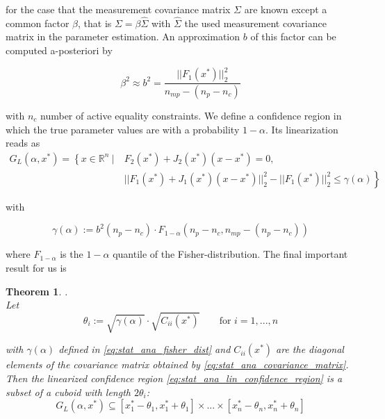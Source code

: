\documentclass{scrartcl}[12pt, halfparskip]
\numberwithin{equation}{section}
\numberwithin{figure}{section}
\numberwithin{table}{section}
\newtheorem{Theorem}{Theorem}
\begin{document}
for the case that the measurement covariance matrix $\Sigma$ are known except a common factor $\beta$, that is $\Sigma = \beta \hat{\Sigma}$ with $\hat{\Sigma}$ the used measurement covariance matrix in the parameter estimation. An approximation $b$ of this factor can be computed a-posteriori by

\begin{equation}
	\beta^2 \approx b^2 = \frac{|| F_1(x^*) ||_2^2}{n_{mp} - (n_p - n_c)}
\end{equation}

with $n_c$ number of active equality constraints. We define a confidence region in which the true parameter values are with a probability $1-\alpha$. Its linearization reads as
\begin{align}
	G_L(\alpha, x^*) = \left\{ x \in \mathbb{R}^n \ | \ \right. & F_2(x^*) + J_2(x^*)(x - x^*) = 0, \label{eq:stat_ana_lin_confidence_region} \\ 
	& \left. || F_1(x^*) + J_1(x^*)(x - x^*) ||_2^2 - || F_1(x^*)||_2^2 \le \gamma(\alpha) \right\} \nonumber	
\end{align}

with 

\begin{equation}
	\gamma(\alpha) := b^2 (n_p - n_c) \cdot F_{1-\alpha}(n_p - n_c, n_{mp} - (n_p - n_c))
	\label{eq:stat_ana_fisher_dist}
\end{equation}

where $F_{1-\alpha}$ is the $1-\alpha$ quantile of the Fisher-distribution. The final important result for us is

\begin{Theorem} .\\
	Let 
	\begin{equation}
		\theta_i := \sqrt{\gamma(\alpha)} \cdot \sqrt{C_{ii}(x^*)} \qquad \text{for } i=1,...,n
	\end{equation}
	
	with $\gamma(\alpha)$ defined in \eqref{eq:stat_ana_fisher_dist} and $C_{ii}(x^*)$ are the diagonal elements of the covariance matrix obtained by \eqref{eq:stat_ana_covariance_matrix}. Then the linearized confidence region \eqref{eq:stat_ana_lin_confidence_region} is a subset of a cuboid with length $2 \theta_i$:
	\begin{equation}
		G_L(\alpha, x^*) \subseteq [x_1^* - \theta_1, x_1^* + \theta_1] \times ... \times [x_n^* - \theta_n, x_n^* + \theta_n]
	\end{equation}
	
\end{Theorem}
\end{document}
